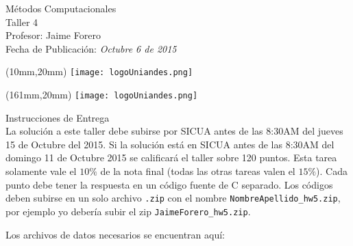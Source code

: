 \documentclass[11pt,letterpaper]{exam}
\begin{document}
\begin{center}
{\Large Métodos Computacionales} \\
Taller 4 \\
Profesor: Jaime Forero\\
Fecha de Publicación: {\small \it Octubre 6 de 2015}\\
\end{center}

\begin{textblock*}{40mm}(10mm,20mm)
  \texttt{[image: logoUniandes.png]}
\end{textblock*}

\begin{textblock*}{40mm}(161mm,20mm)
  \texttt{[image: logoUniandes.png]}
\end{textblock*}

\vspace{0.5cm}

{\Large Instrucciones de Entrega}\\

\noindent
La solución a este taller debe subirse por SICUA antes de las 8:30AM
del jueves 15 de Octubre del 2015. 
\noindent
Si la soluci\'on est\'a en SICUA
antes de las 8:30AM del domingo 11 de Octubre 2015 se calificar\'a
el taller sobre 120 puntos. 
\noindent
Esta tarea solamente vale el $10\%$ de la nota final (todas las otras
tareas valen el $15\%$).
\noindent
Cada punto debe tener la respuesta en un c\'odigo fuente de C
separado. Los c\'odigos deben subirse en un solo archivo
\verb".zip" con el nombre \verb"NombreApellido_hw5.zip", por ejemplo
yo deber\'ia subir el zip \verb"JaimeForero_hw5.zip".

\noindent
Los archivos de datos necesarios se encuentran aqu\'i:
\end{document}
